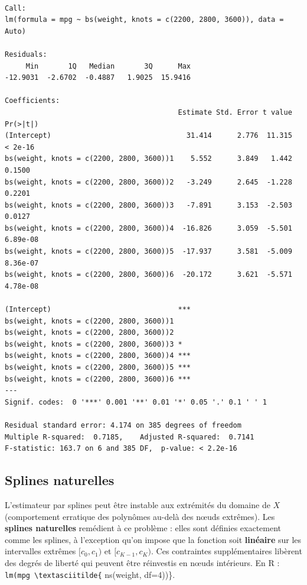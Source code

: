 \documentclass[
  french,
  letterpaper,
  DIV=11,
  numbers=noendperiod]{scrreprt}
\begin{document}
\begin{verbatim}

Call:
lm(formula = mpg ~ bs(weight, knots = c(2200, 2800, 3600)), data = Auto)

Residuals:
     Min       1Q   Median       3Q      Max 
-12.9031  -2.6702  -0.4887   1.9025  15.9416 

Coefficients:
                                         Estimate Std. Error t value Pr(>|t|)
(Intercept)                                31.414      2.776  11.315  < 2e-16
bs(weight, knots = c(2200, 2800, 3600))1    5.552      3.849   1.442   0.1500
bs(weight, knots = c(2200, 2800, 3600))2   -3.249      2.645  -1.228   0.2201
bs(weight, knots = c(2200, 2800, 3600))3   -7.891      3.153  -2.503   0.0127
bs(weight, knots = c(2200, 2800, 3600))4  -16.826      3.059  -5.501 6.89e-08
bs(weight, knots = c(2200, 2800, 3600))5  -17.937      3.581  -5.009 8.36e-07
bs(weight, knots = c(2200, 2800, 3600))6  -20.172      3.621  -5.571 4.78e-08
                                            
(Intercept)                              ***
bs(weight, knots = c(2200, 2800, 3600))1    
bs(weight, knots = c(2200, 2800, 3600))2    
bs(weight, knots = c(2200, 2800, 3600))3 *  
bs(weight, knots = c(2200, 2800, 3600))4 ***
bs(weight, knots = c(2200, 2800, 3600))5 ***
bs(weight, knots = c(2200, 2800, 3600))6 ***
---
Signif. codes:  0 '***' 0.001 '**' 0.01 '*' 0.05 '.' 0.1 ' ' 1

Residual standard error: 4.174 on 385 degrees of freedom
Multiple R-squared:  0.7185,    Adjusted R-squared:  0.7141 
F-statistic: 163.7 on 6 and 385 DF,  p-value: < 2.2e-16
\end{verbatim}

\subsection{Splines naturelles}\label{splines-naturelles}

L'estimateur par splines peut être instable aux extrémités du domaine de
\(X\) (comportement erratique des polynômes au-delà des nœuds extrêmes).
Les \textbf{splines naturelles} remédient à ce problème : elles sont
définies exactement comme les splines, à l'exception qu'on impose que la
fonction soit \textbf{linéaire} sur les intervalles extrêmes
\([c_0,c_1)\) et \([c_{K-1},c_K)\). Ces contraintes supplémentaires
libèrent des degrés de liberté qui peuvent être réinvestis en nœuds
intérieurs. En R : \texttt{lm(mpg\ \textbackslash{}textasciitilde\{}
ns(weight, df=4))\}.
\end{document}
